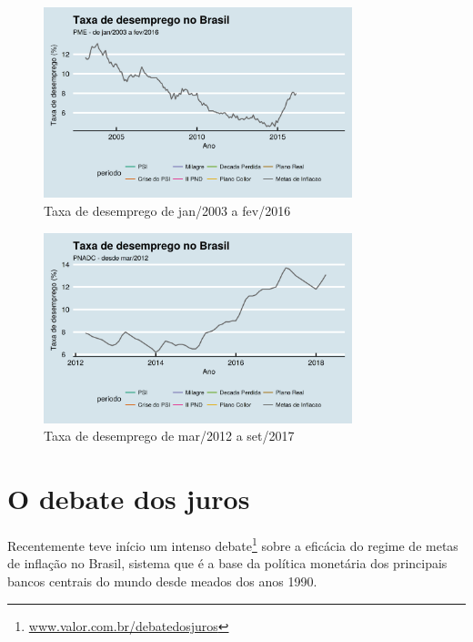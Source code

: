 \documentclass[
	10pt,				%
	openright,			%
	twoside,			%
	a5paper,			%
	english,			%
	french,				%
	spanish,			%
	brazil				%
	]{abntex2}
\begin{document}
\begin{figure}[htbp]
\caption{Taxa de desemprego de jan/2003 a fev/2016}\label{desemprego2}
\begin{center}
\includegraphics[width=0.80000\textwidth]{imagens/desemprego2-1.png}
\end{center}
\end{figure}

\begin{figure}[htbp]
\caption{Taxa de desemprego de mar/2012 a set/2017}\label{desemprego3}
\begin{center}
\includegraphics[width=0.80000\textwidth]{imagens/desemprego3-1.png}
\end{center}
\end{figure}

\section{O debate dos juros}\label{o-debate-dos-juros}

Recentemente teve início um intenso debate\footnote{\href{http://www.valor.com.br/debatedosjuros}{www.valor.com.br/debatedosjuros}}
sobre a eficácia do regime de metas de inflação no Brasil, sistema que é
a base da política monetária dos principais bancos centrais do mundo
desde meados dos anos 1990.
\end{document}
